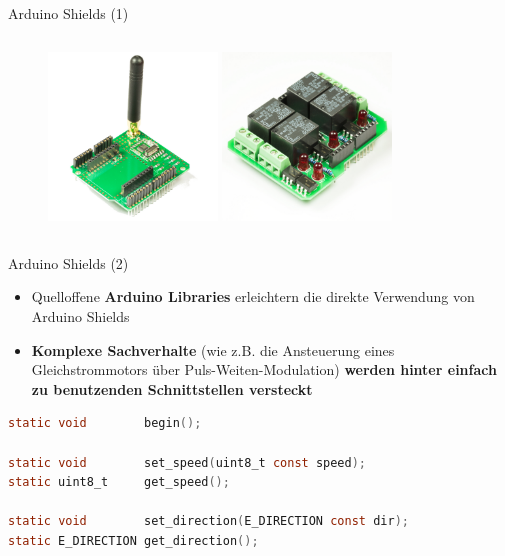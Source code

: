 \documentclass{beamer}
\begin{document}
\begin{frame}{Arduino Shields (1)}
\begin{columns}
\begin{column}{0.5\textwidth}
\begin{figure}
			\includegraphics[width=0.4\textwidth]{./images/funk-shield.jpg}
			\includegraphics[width=0.4\textwidth]{./images/relais-shield.jpg}
		\end{figure}
	\end{column}
\end{columns}
\end{frame}
\begin{frame}[fragile]{Arduino Shields (2)}
\begin{itemize}
	\item Quelloffene \textbf{Arduino Libraries} erleichtern die direkte Verwendung von Arduino Shields 
\end{itemize}
\begin{itemize}
	\item \textbf{Komplexe Sachverhalte} (wie z.B. die Ansteuerung eines Gleichstrommotors \"uber Puls-Weiten-Modulation) \textbf{werden hinter einfach zu benutzenden Schnittstellen versteckt}
\end{itemize}
\begin{lstlisting}[frame=single, language=C]
static void        begin();

static void        set_speed(uint8_t const speed);
static uint8_t     get_speed();

static void        set_direction(E_DIRECTION const dir);
static E_DIRECTION get_direction();
\end{lstlisting}
\end{frame}
\end{document}
